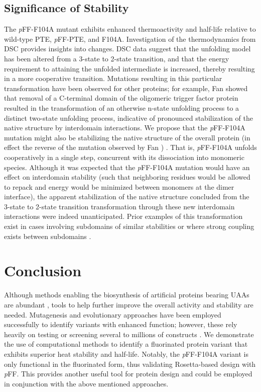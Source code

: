 \begin{refsection}
\subsection{Significance of Stability}

The \emph{p}FF-F104A mutant exhibits enhanced thermoactivity and half-life
relative to wild-type PTE, \emph{p}FF-PTE, and F104A.  Investigation of the
thermodynamics from DSC provides insights into changes.  DSC data suggest that
the unfolding model has been altered from a 3-state to 2-state transition, and
that the energy requirement to attaining the unfolded intermediate is
increased, thereby resulting in a more cooperative transition.  Mutations
resulting in this particular transformation have been observed for other
proteins; for example, Fan  showed that removal of a C-terminal
domain of the oligomeric  trigger factor protein resulted in the
transformation of an otherwise n-state unfolding process to a distinct
two-state unfolding process, indicative of pronounced stabilization of the
native structure by interdomain interactions. We propose that the
\emph{p}FF-F104A mutation might also be stabilizing the native structure of the
overall protein (in effect the reverse of the mutation observed by Fan
) \cite{Fan2008}. That is, \emph{p}FF-F104A unfolds cooperatively
in a single step, concurrent with its dissociation into monomeric species.
Although it was expected that the \emph{p}FF-F104A mutation would have an
effect on interdomain stability (such that neighboring residues would be
allowed to repack and energy would be minimized between monomers at the dimer
interface), the apparent stabilization of the native structure concluded from
the 3-state to 2-state transition transformation through these new interdomain
interactions were indeed unanticipated. Prior examples of this transformation
exist in cases involving subdomains of similar stabilities or where strong
coupling exists between subdomains \cite{Tsytlonok2013}.

\section{Conclusion}

Although methods enabling the biosynthesis of artificial proteins bearing UAAs
are abundant \cite{Voloshchuk2009}, tools to help further improve the overall
activity and stability are needed. Mutagenesis and evolutionary approaches have
been employed successfully to identify variants with enhanced function;
however, these rely heavily on testing or screening several to millions of
constructs \cite{Voloshchuk2007b,Montclare2006b,Yoo2007}. We demonstrate the use
of computational methods to identify a fluorinated protein variant that
exhibits superior heat stability and half-life. Notably, the \emph{p}FF-F104A
variant is only functional in the fluorinated form, thus validating
Rosetta-based design with \emph{p}FF. This provides another useful tool for
protein design and could be employed in conjunction with the above mentioned
approaches.

\printbibliography[heading=subbibliography]
\end{refsection}
